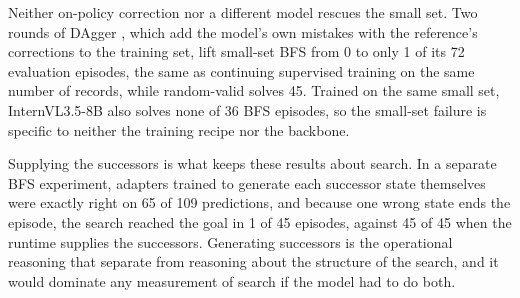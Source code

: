 Neither on-policy correction nor a different model rescues the small set. Two rounds of DAgger \citep{ross2011dagger}, which add the model's own mistakes with the reference's corrections to the training set, lift small-set BFS from 0 to only 1 of its 72 evaluation episodes, the same as continuing supervised training on the same number of records, while random-valid solves 45. Trained on the same small set, InternVL3.5-8B \citep{wang2025internvl35} also solves none of 36 BFS episodes, so the small-set failure is specific to neither the training recipe nor the backbone.

Supplying the successors is what keeps these results about search. In a separate BFS experiment, adapters trained to generate each successor state themselves were exactly right on 65 of 109 predictions, and because one wrong state ends the episode, the search reached the goal in 1 of 45 episodes, against 45 of 45 when the runtime supplies the successors. Generating successors is the operational reasoning that \citet{huang2026twodistinct} separate from reasoning about the structure of the search, and it would dominate any measurement of search if the model had to do both.

